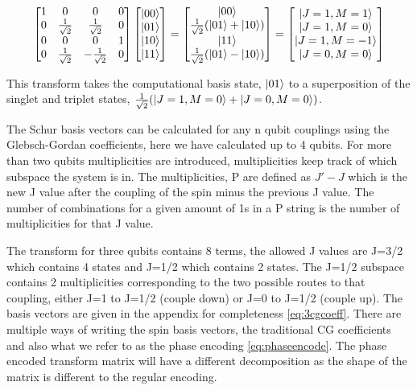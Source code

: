 \documentclass[12pt]{article}
\begin{document}
\begin{align}
\begin{bmatrix}
1 & 0 & 0 & 0 \\
0 & \frac{1}{\sqrt{2}} & \frac{1}{\sqrt{2}} & 0 \\
0 & 0 & 0 & 1 \\
0 & \frac{1}{\sqrt{2}} & -\frac{1}{\sqrt{2}} & 0 \\
\end{bmatrix}
\begin{bmatrix}
\left\vert{00}\right\rangle \\
\left\vert{01}\right\rangle \\
\left\vert{10}\right\rangle \\
\left\vert{11}\right\rangle \\ 
\end{bmatrix}
=
\begin{bmatrix}
\left\vert{00}\right\rangle \\
\frac{1}{\sqrt{2}}(\left\vert{01}\right\rangle + \left\vert{10}\right\rangle) \\
\left\vert{11}\right\rangle \\
\frac{1}{\sqrt{2}}(\left\vert{01}\right\rangle - \left\vert{10}\right\rangle) \\ 
\end{bmatrix}
=
\begin{bmatrix}
\left\vert{J=1, M=1}\right\rangle \\
\left\vert{J=1, M=0}\right\rangle \\
\left\vert{J=1, M=-1}\right\rangle \\
\left\vert{J=0, M=0}\right\rangle \\ 
\end{bmatrix}
\end{align}

This transform takes the computational basis state, $\left\vert{01}\right\rangle$ to a superposition of the singlet and triplet states, $\frac{1}{\sqrt{2}} (\left\vert{J=1, M=0}\right\rangle + \left\vert{J=0, M=0}\right\rangle)$. 

The Schur basis vectors can be calculated for any n qubit couplings using the Glebsch-Gordan coefficients, here we have calculated up to 4 qubits. For more than two qubits multiplicities are introduced, multiplicities keep track of which subspace the system is in. The multiplicities, P are defined as $J'-J$ which is the new J value after the coupling of the spin minus the previous J value. The number of combinations for a given amount of 1s in a P string is the number of multiplicities for that J value.

The transform for three qubits contains 8 terms, the allowed J values are J=3/2 which contains 4 states and J=1/2 which contains 2 states. The J=1/2 subspace contains 2 multiplicities corresponding to the two possible routes to that coupling, either J=1 to J=1/2 (couple down) or J=0 to J=1/2 (couple up). The basis vectors are given in the appendix for completeness \autoref{eq:3cgcoeff}. There are multiple ways of writing the spin basis vectors, the traditional CG coefficients and also what we refer to as the phase encoding \autoref{eq:phaseencode}. The phase encoded transform matrix will have a different decomposition as the shape of the matrix is different to the regular encoding. 
\end{document}
